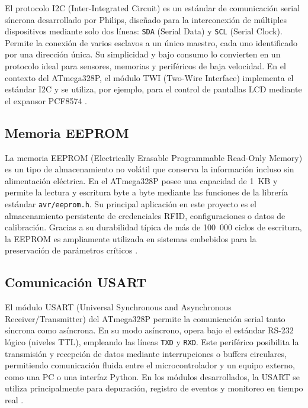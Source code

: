 El protocolo I2C (Inter-Integrated Circuit) es un estándar de comunicación serial síncrona desarrollado por Philips, diseñado para la interconexión de múltiples dispositivos mediante solo dos líneas: \texttt{SDA} (Serial Data) y \texttt{SCL} (Serial Clock). Permite la conexión de varios esclavos a un único maestro, cada uno identificado por una dirección única. Su simplicidad y bajo consumo lo convierten en un protocolo ideal para sensores, memorias y periféricos de baja velocidad. En el contexto del ATmega328P, el módulo TWI (Two-Wire Interface) implementa el estándar I2C y se utiliza, por ejemplo, para el control de pantallas LCD mediante el expansor PCF8574 \cite{philips_i2c_specification_2000, atmega328p_datasheet}.


\subsection{Memoria EEPROM}

La memoria EEPROM (Electrically Erasable Programmable Read-Only Memory) es un tipo de almacenamiento no volátil que conserva la información incluso sin alimentación eléctrica. En el ATmega328P posee una capacidad de 1~KB y permite la lectura y escritura byte a byte mediante las funciones de la librería estándar \texttt{avr/eeprom.h}. Su principal aplicación en este proyecto es el almacenamiento persistente de credenciales RFID, configuraciones o datos de calibración. Gracias a su durabilidad típica de más de 100~000 ciclos de escritura, la EEPROM es ampliamente utilizada en sistemas embebidos para la preservación de parámetros críticos \cite{microchip_eeprom_appnote_2019, atmega328p_datasheet}.


\subsection{Comunicación USART}

El módulo USART (Universal Synchronous and Asynchronous Receiver/Transmitter) del ATmega328P permite la comunicación serial tanto síncrona como asíncrona. En su modo asíncrono, opera bajo el estándar RS-232 lógico (niveles TTL), empleando las líneas \texttt{TXD} y \texttt{RXD}. Este periférico posibilita la transmisión y recepción de datos mediante interrupciones o buffers circulares, permitiendo comunicación fluida entre el microcontrolador y un equipo externo, como una PC o una interfaz Python. En los módulos desarrollados, la USART se utiliza principalmente para depuración, registro de eventos y monitoreo en tiempo real \cite{tanenbaum_serial_comm_2011, avr_libc_manual_2_2_0}.


